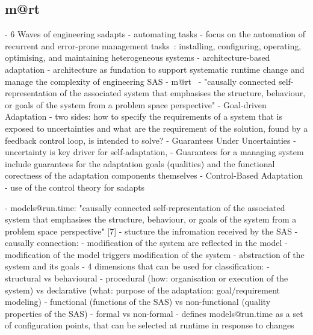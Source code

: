\subsection[Models@run.time]{\Gls{m@rt}}

- 6 Waves of engineering \glspl{sadapt}
	- automating tasks
		- focus on the automation of recurrent and error-prone management tasks~\cite{DBLP:journals/computer/KephartC03}: installing, configuring, operating, optimising, and maintaining heterogeneous systems 
	- architecture-based adaptation
		- architecture as fundation to support systematic runtime change and manage the complexity of engineering SAS
	- \Gls{m@rt}~\cite{DBLP:journals/computer/BlairBF09}
		- "causally connected self-representation of the associated system that emphasises the structure, behaviour, or goals of the system from a problem space perspective"
	- Goal-driven Adaptation
		- two sides: how to specify the requirements of a system that is exposed to uncertainties and what are the requirement of the solution, found by a feedback control loop, is intended to solve?
	- Guarantees Under Uncertainties
		- uncertainty is key driver for self-adaptation, 
		- Guarantees for a managing system include guarantees for the adaptation goals (qualities) and the functional corectness of the adaptation components themselves
	- Control-Based Adaptation
		- use of the control theory for \glspl{sadapt}
		
		
- models@run.time: "causally connected self-representation of the associated system that emphasises the structure, behaviour, or goals of the system from a problem space perspective" [7]
    - stucture the infromation received by the SAS
    - causally connection:
        - modification of the system are reflected in the model
        - modification of the model triggers modification of the system
    - abstraction of the system and its goals
    - 4 dimensions that can be used for classification:
        - structural vs behavioural
        - procedural (how: organisation or execution of the system) vs declarative (what: purpose of the adaptation: goal/requirement modeling)
        - functional (functions of the SAS) vs non-functional (quality properties of the SAS)
        - formal vs non-formal
    - \cite{DBLP:journals/computer/MorinBJFS09} defines models@run.time as a set of configuration points, that can be selected at runtime in response to changes

